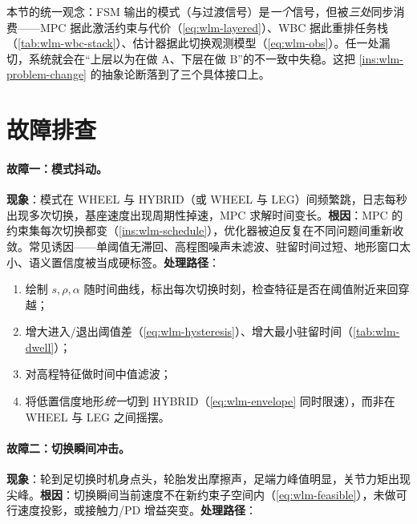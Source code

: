 \begin{insight}\label{ins:wlm-one-signal}
本节的统一观念：FSM 输出的模式（与过渡信号）是\emph{一个}信号，但被\emph{三处}同步消费——MPC 据此激活约束与代价（\cref{eq:wlm-layered}）、WBC 据此重排任务栈（\cref{tab:wlm-wbc-stack}）、估计器据此切换观测模型（\cref{eq:wlm-obs}）。任一处漏切，系统就会在“上层以为在做 A、下层在做 B”的不一致中失稳。这把 \cref{ins:wlm-problem-change} 的抽象论断落到了三个具体接口上。
\end{insight}

\section{故障排查}
\label{sec:wlm-debug}

\paragraph{故障一：模式抖动。}
\textbf{现象}：模式在 WHEEL 与 HYBRID（或 WHEEL 与 LEG）间频繁跳，日志每秒出现多次切换，基座速度出现周期性掉速，MPC 求解时间变长。\textbf{根因}：MPC 的约束集每次切换都变（\cref{ins:wlm-schedule}），优化器被迫反复在不同问题间重新收敛。常见诱因——单阈值无滞回、高程图噪声未滤波、驻留时间过短、地形窗口太小、语义置信度被当成硬标签。\textbf{处理路径}：

\begin{enumerate}
  \item 绘制 $s,\rho,\alpha$ 随时间曲线，标出每次切换时刻，检查特征是否在阈值附近来回穿越；
  \item 增大进入/退出阈值差（\cref{eq:wlm-hysteresis}）、增大最小驻留时间（\cref{tab:wlm-dwell}）；
  \item 对高程特征做时间中值滤波；
  \item 将低置信度地形\emph{统一}切到 HYBRID（\cref{eq:wlm-envelope} 同时限速），而非在 WHEEL 与 LEG 之间摇摆。
\end{enumerate}

\paragraph{故障二：切换瞬间冲击。}
\textbf{现象}：轮到足切换时机身点头，轮胎发出摩擦声，足端力峰值明显，关节力矩出现尖峰。\textbf{根因}：切换瞬间当前速度不在新约束子空间内（\cref{eq:wlm-feasible}），未做可行速度投影，或接触力/PD 增益突变。\textbf{处理路径}：

